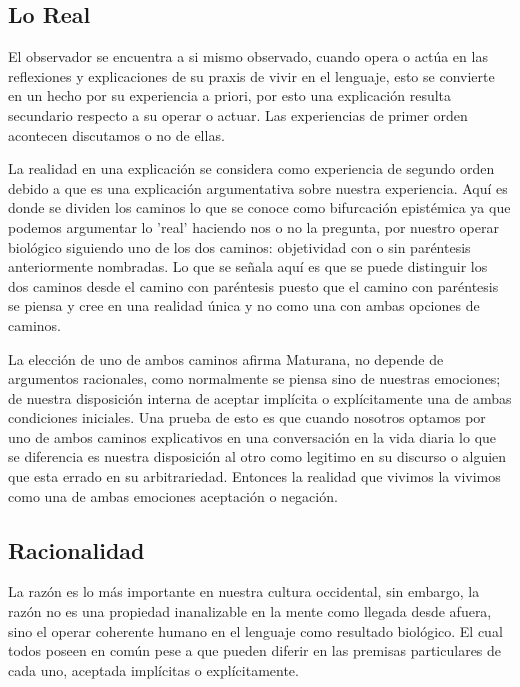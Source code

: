 \documentclass[10pt]{article}
\begin{document}
        \subsection{Lo Real}

        El observador se encuentra a si mismo observado, cuando opera o actúa en las reflexiones y explicaciones de su praxis de vivir en el lenguaje, esto se convierte en un hecho por su experiencia a priori, por esto una explicación resulta secundario respecto a su operar o actuar. Las experiencias de primer orden acontecen discutamos o no de ellas.

        La realidad en una explicación se considera como experiencia de segundo orden debido a que es una explicación argumentativa sobre nuestra experiencia. Aquí es donde se dividen los caminos lo que se conoce como bifurcación epistémica ya que podemos argumentar lo 'real' haciendo nos o no la pregunta, por nuestro operar biológico siguiendo uno de los dos caminos: objetividad con o sin paréntesis anteriormente nombradas. Lo que se señala aquí es que se puede distinguir los dos caminos desde el camino con paréntesis puesto que el camino con paréntesis se piensa y cree en una realidad única y no como una con ambas opciones de caminos.

        La elección de uno de ambos caminos afirma Maturana, no depende de argumentos racionales, como normalmente se piensa sino de nuestras emociones; de nuestra disposición interna de aceptar implícita o explícitamente una de ambas condiciones iniciales. Una prueba de esto es que cuando nosotros optamos por uno de ambos caminos explicativos en una conversación en la vida diaria lo que se diferencia es nuestra disposición al otro como legitimo en su discurso o alguien que esta errado en su arbitrariedad. Entonces la realidad que vivimos la vivimos como una de ambas emociones aceptación o negación.

        
        \subsection{Racionalidad}

        La razón es lo más importante en nuestra cultura occidental, sin embargo, la razón no es una propiedad inanalizable en la mente como llegada desde afuera, sino el operar coherente humano en el lenguaje como resultado biológico. El cual todos poseen en común pese a que pueden diferir en las premisas particulares de cada uno, aceptada implícitas o explícitamente. 
        
\end{document}
